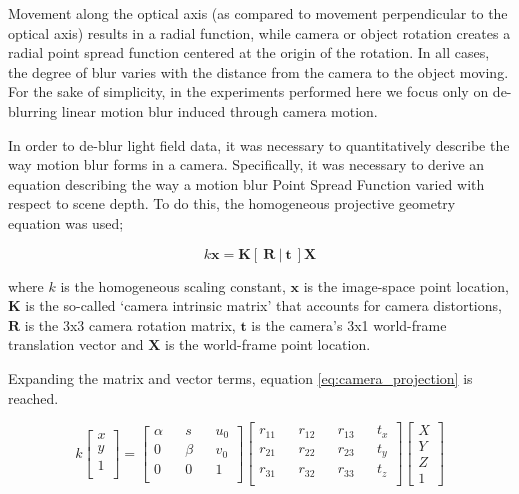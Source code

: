 Movement along the optical axis (as compared to movement perpendicular to the optical axis) results in a radial 
 function, while camera or object rotation creates a radial point spread function centered at the origin of the rotation.
In all cases, the degree of blur varies with the distance from the camera to the object moving.
For the sake of simplicity, in the experiments performed here we focus only on de-blurring linear motion blur induced through camera motion.

In order to de-blur light field data, it was necessary to quantitatively describe the way motion blur forms in a camera.
Specifically, it was necessary to derive an equation describing the way a motion blur Point Spread Function varied with respect to scene depth.
To do this, the homogeneous projective geometry equation was used;

\begin{equation}
\label{eq:camera_projection_unexpanded}
k \boldsymbol{x} = \boldsymbol{K} \left[~\boldsymbol{R}~|~\boldsymbol{t}~\right] \boldsymbol{X}
\end{equation}

\noindent
where $k$ is the homogeneous scaling constant, $\boldsymbol{x}$ is the image-space point location, $\boldsymbol{K}$ is the so-called \enquote*{camera intrinsic matrix} that accounts for camera distortions, $\boldsymbol{R}$ is the 3x3 camera rotation matrix,  $\boldsymbol{t}$ is the camera's 3x1 world-frame translation vector and $\boldsymbol{X}$ is the world-frame point location.

Expanding the matrix and vector terms, equation \ref{eq:camera_projection} is reached.

\begin{equation}
\label{eq:camera_projection}
k
\begin{bmatrix}
x \\
y \\
1 \\
\end{bmatrix}
=
\begin{bmatrix}
\alpha && s && u_0 \\
0 && \beta && v_0 \\
0 && 0 && 1 \\
\end{bmatrix}
\begin{bmatrix}
r_{11} && r_{12} && r_{13} && t_x \\
r_{21} && r_{22} && r_{23} && t_y \\
r_{31} && r_{32} && r_{33} && t_z \\
\end{bmatrix}
\begin{bmatrix}
X \\
Y \\
Z \\
1
\end{bmatrix}
\end{equation}

